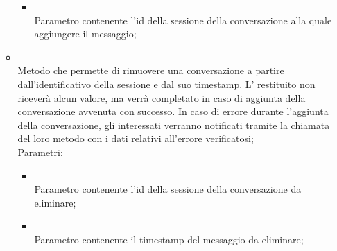 \begin{itemize}
\begin{itemize}
\begin{itemize}
			\item {} \\
			Parametro contenente l'id della sessione della conversazione alla quale aggiungere il messaggio;
		\end{itemize}
		\item[]  \\
		Metodo che permette di rimuovere una conversazione a partire dall'identificativo della sessione e dal suo timestamp.  L' restituito non riceverà alcun valore, ma verrà completato in caso di aggiunta della conversazione avvenuta con successo. In caso di errore durante l'aggiunta della conversazione, gli  interessati verranno notificati tramite la chiamata del loro metodo  con i dati relativi all'errore verificatosi;\\
		Parametri:
		\begin{itemize}
			\item {} \\
			Parametro contenente l'id della sessione della conversazione da eliminare;
			\item {} \\
			Parametro contenente il timestamp del messaggio da eliminare;
		\end{itemize}
	\end{itemize}
\end{itemize}
\FloatBarrier

